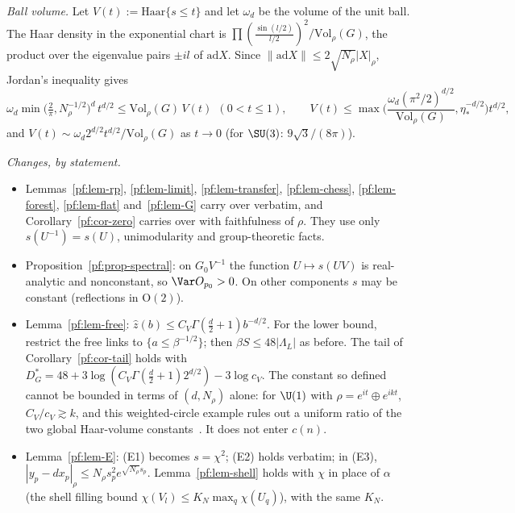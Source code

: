 \emph{Ball volume.} Let $V(t):=\mathrm{Haar}\{s\le t\}$ and let $\omega_d$ be the volume of the unit ball. The Haar density in the exponential chart is $\prod(\frac{\sin(l/2)}{l/2})^2/\mathrm{Vol}_\rho(G)$, the product over the eigenvalue pairs $\pm il$ of $\mathrm{ad}X$. Since $\|\mathrm{ad}X\|\le2\sqrt{N_\rho}|X|_\rho$, Jordan's inequality gives
\[
\omega_d\min\big(\tfrac2\pi,N_\rho^{-1/2}\big)^d\,t^{d/2}\le \mathrm{Vol}_\rho(G)\,V(t)\ \ (0<t\le1),\qquad V(t)\le\max\Big(\frac{\omega_d(\pi^2/2)^{d/2}}{\mathrm{Vol}_\rho(G)},\eta_*^{-d/2}\Big)t^{d/2},
\]
and $V(t)\sim\omega_d2^{d/2}t^{d/2}/\mathrm{Vol}_\rho(G)$ as $t\to0$ (for $\SU(3)$: $9\sqrt3/(8\pi)$).

\emph{Changes, by statement.}
\begin{itemize}
\item[(i)] Lemmas~\ref{pf:lem-rp}, \ref{pf:lem-limit}, \ref{pf:lem-transfer}, \ref{pf:lem-chess}, \ref{pf:lem-forest}, \ref{pf:lem-flat} and~\ref{pf:lem-G} carry over verbatim, and Corollary~\ref{pf:cor-zero} carries over with faithfulness of $\rho$. They use only $s(U^{-1})=s(U)$, unimodularity and group-theoretic facts.
\item[(ii)] Proposition~\ref{pf:prop-spectral}: on $G_0V^{-1}$ the function $U\mapsto s(UV)$ is real-analytic and nonconstant, so $\Var O_{p_0}>0$. On other components $s$ may be constant (reflections in $\mathrm O(2)$).
\item[(iii)] Lemma~\ref{pf:lem-free}: $\hat z(b)\le C_V\Gamma(\frac d2+1)b^{-d/2}$. For the lower bound, restrict the free links to $\{a\le\beta^{-1/2}\}$; then $\beta S\le48|\Lambda_L|$ as before. The tail of Corollary~\ref{pf:cor-tail} holds with $D^*_G=48+3\log(C_V\Gamma(\frac d2+1)2^{d/2})-3\log c_V$. The constant so defined cannot be bounded in terms of $(d,N_\rho)$ alone: for $\U(1)$ with $\rho=e^{it}\oplus e^{ikt}$, $C_V/c_V\gtrsim k$, and this weighted-circle example rules out a uniform ratio of the two global Haar-volume constants~\cite[comment 7105396100]{RepoThread}. It does not enter $c(n)$.
\item[(iv)] Lemma~\ref{pf:lem-E}: (E1) becomes $s=\chi^2$; (E2) holds verbatim; in (E3), $|y_p-dx_p|_\rho\le N_\rho s_p^2e^{\sqrt{N_\rho}s_p}$. Lemma~\ref{pf:lem-shell} holds with $\chi$ in place of $\alpha$ (the shell filling bound $\chi(V_l)\le K_N\max_q\chi(U_q)$), with the same $K_N$.

\end{itemize}
